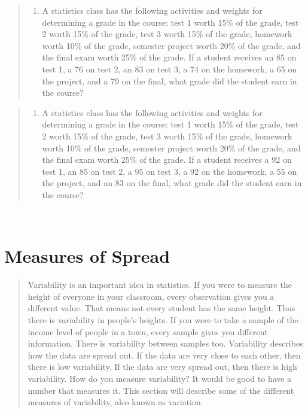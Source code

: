 \documentclass[]{book}
\providecommand{\tightlist}{%
  \setlength{\itemsep}{0pt}\setlength{\parskip}{0pt}}
\begin{document}
\begin{quote}
\begin{enumerate}
\def\labelenumi{\arabic{enumi}.}
\setcounter{enumi}{8}
\tightlist
\item
  A statistics class has the following activities and weights for determining a grade in the course: test 1 worth 15\% of the grade, test 2 worth 15\% of the grade, test 3 worth 15\% of the grade, homework worth 10\% of the grade, semester project worth 20\% of the grade, and the final exam worth 25\% of the grade. If a student receives an 85 on test 1, a 76 on test 2, an 83 on test 3, a 74 on the homework, a 65 on the project, and a 79 on the final, what grade did the student earn in the course?
\end{enumerate}
\end{quote}

\begin{quote}
\begin{enumerate}
\def\labelenumi{\arabic{enumi}.}
\setcounter{enumi}{9}
\tightlist
\item
  A statistics class has the following activities and weights for determining a grade in the course: test 1 worth 15\% of the grade, test 2 worth 15\% of the grade, test 3 worth 15\% of the grade, homework worth 10\% of the grade, semester project worth 20\% of the grade, and the final exam worth 25\% of the grade. If a student receives a 92 on test 1, an 85 on test 2, a 95 on test 3, a 92 on the homework, a 55 on the project, and an 83 on the final, what grade did the student earn in the course?
\end{enumerate}
\end{quote}

\textbf{\\
}

\hypertarget{measures-of-spread}{%
\section{Measures of Spread}\label{measures-of-spread}}

\begin{quote}
Variability is an important idea in statistics. If you were to measure the height of everyone in your classroom, every observation gives you a different value. That means not every student has the same height. Thus there is variability in people's heights. If you were to take a sample of the income level of people in a town, every sample gives you different information. There is variability between samples too. Variability describes how the data are spread out. If the data are very close to each other, then there is low variability. If the data are very spread out, then there is high variability. How do you measure variability? It would be good to have a number that measures it. This section will describe some of the different measures of variability, also known as variation.
\end{quote}
\end{document}

